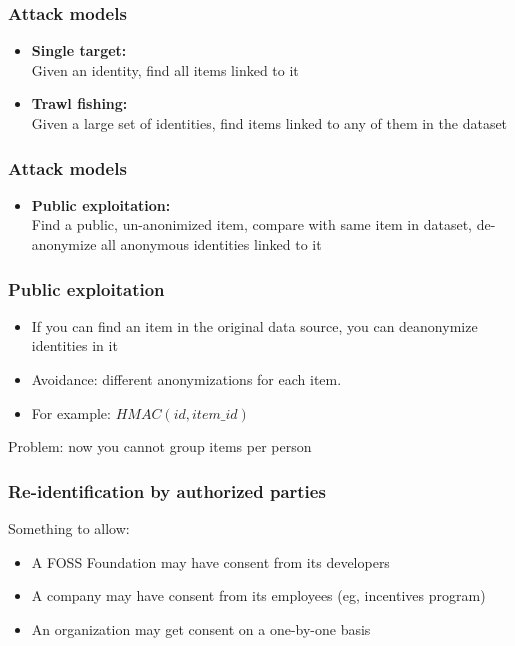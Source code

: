 \documentclass[17pt,aspectratio=169,hyperref={pdfusetitle,colorlinks,allcolors=olive}]{beamer}
\begin{document}
\begin{frame}[fragile]
  \frametitle{Attack models}

  \begin{itemize}
  \item \textbf{Single target:} \\
    Given an identity, find all items linked to it
  \item \textbf{Trawl fishing:} \\
    Given a large set of identities, find items linked to any of them in the dataset
  \end{itemize}
\end{frame}

\begin{frame}[fragile]
  \frametitle{Attack models}

  \begin{itemize}
  \item \textbf{Public exploitation:} \\
    Find a public, un-anonimized item, compare with same item in dataset, de-anonymize all anonymous identities linked to it
  \end{itemize}

  \begin{center}
  \end{center}
\end{frame}

\begin{frame}[fragile]
  \frametitle{Public exploitation}
  
  \begin{itemize}
  \item If you can find an item in the original data source, you can deanonymize identities in it
  \item Avoidance: different anonymizations for each item.
  \item For example: $HMAC(id, item\_id)$
  \end{itemize}

  \begin{center}
    Problem: now you cannot group items per person
  \end{center}
\end{frame}

\begin{frame}[fragile]
  \frametitle{Re-identification by authorized parties}

  Something to allow:
  
  \begin{itemize}
  \item A FOSS Foundation may have consent from its developers
  \item A company may have consent from its employees (eg, incentives program)
  \item An organization may get consent on a one-by-one basis
  \end{itemize}

\end{frame}
\end{document}
